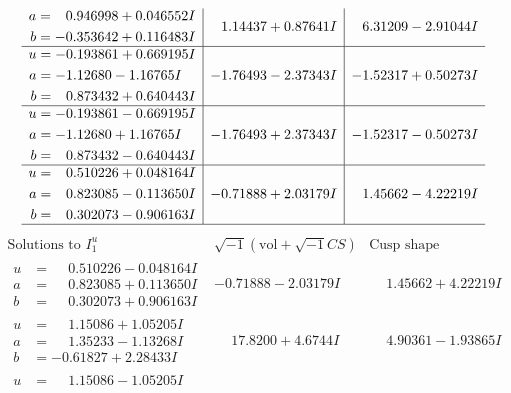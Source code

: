 \documentclass[1p]{elsarticle_modified}
\theoremstyle{definition}
\newcommand{\I}{\sqrt{-1}}
\begin{document}
$$\begin{array}{c|c|c}
\begin{aligned}
a &= \phantom{-}0.946998 + 0.046552 I \\
b &= -0.353642 + 0.116483 I\end{aligned}
 & \phantom{-}1.14437 + 0.87641 I & \phantom{-}6.31209 - 2.91044 I \\ \hline\begin{aligned}
u &= -0.193861 + 0.669195 I \\
a &= -1.12680 - 1.16765 I \\
b &= \phantom{-}0.873432 + 0.640443 I\end{aligned}
 & -1.76493 - 2.37343 I & -1.52317 + 0.50273 I \\ \hline\begin{aligned}
u &= -0.193861 - 0.669195 I \\
a &= -1.12680 + 1.16765 I \\
b &= \phantom{-}0.873432 - 0.640443 I\end{aligned}
 & -1.76493 + 2.37343 I & -1.52317 - 0.50273 I \\ \hline\begin{aligned}
u &= \phantom{-}0.510226 + 0.048164 I \\
a &= \phantom{-}0.823085 - 0.113650 I \\
b &= \phantom{-}0.302073 - 0.906163 I\end{aligned}
 & -0.71888 + 2.03179 I & \phantom{-}1.45662 - 4.22219 I\\
 \hline 
 \end{array}$$\newpage$$\begin{array}{c|c|c}  
\text{Solutions to }I^u_{1}& \I (\text{vol} + \sqrt{-1}CS) & \text{Cusp shape}\\
 \hline 
\begin{aligned}
u &= \phantom{-}0.510226 - 0.048164 I \\
a &= \phantom{-}0.823085 + 0.113650 I \\
b &= \phantom{-}0.302073 + 0.906163 I\end{aligned}
 & -0.71888 - 2.03179 I & \phantom{-}1.45662 + 4.22219 I \\ \hline\begin{aligned}
u &= \phantom{-}1.15086 + 1.05205 I \\
a &= \phantom{-}1.35233 - 1.13268 I \\
b &= -0.61827 + 2.28433 I\end{aligned}
 & \phantom{-}17.8200 + 4.6744 I & \phantom{-}4.90361 - 1.93865 I \\ \hline\begin{aligned}
u &= \phantom{-}1.15086 - 1.05205 I \\

\end{aligned}
\end{array}$$
\end{document}

